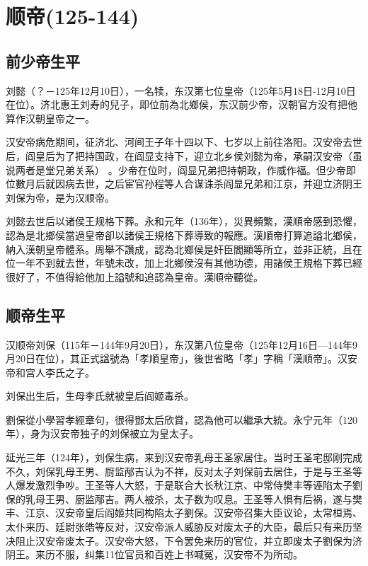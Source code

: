 
\section{顺帝\tiny(125-144)}

\subsection{前少帝生平}

刘懿（？－125年12月10日），一名犊，东汉第七位皇帝（125年5月18日-12月10日在位）。济北惠王刘寿的兒子，即位前為北鄉侯，东汉前少帝，汉朝官方没有把他算作汉朝皇帝之一。

汉安帝病危期间，征济北、河间王子年十四以下、七岁以上前往洛阳。汉安帝去世后，阎皇后为了把持国政，在阎显支持下，迎立北乡侯刘懿为帝，承嗣汉安帝（虽说两者是堂兄弟关系） 。少帝在位时，阎显兄弟把持朝政，作威作福。但少帝即位數月后就因病去世，之后宦官孙程等人合谋诛杀阎显兄弟和江京，并迎立济阴王刘保为帝，是为汉顺帝。

刘懿去世后以诸侯王规格下葬。永和元年（136年），災異頻繁，漢順帝感到恐懼，認為是北鄉侯當過皇帝卻以諸侯王規格下葬導致的報應。漢順帝打算追謚北鄉侯，納入漢朝皇帝體系。周舉不讚成，認為北鄉侯是奸臣閻顯等所立，並非正統，且在位一年不到就去世，年號未改，加上北鄉侯沒有其他功德，用諸侯王規格下葬已經很好了，不值得給他加上謚號和追認為皇帝。漢順帝聽從。

\subsection{顺帝生平}

汉顺帝刘保（115年－144年9月20日），东汉第八位皇帝（125年12月16日—144年9月20日在位），其正式諡號為「孝順皇帝」，後世省略「孝」字稱「漢順帝」。汉安帝和宫人李氏之子。

刘保出生后，生母李氏就被皇后阎姬毒杀。

劉保從小學習孝經章句，很得鄧太后欣賞，認為他可以繼承大統。永宁元年（120年），身为汉安帝独子的刘保被立为皇太子。

延光三年（124年），刘保生病，来到汉安帝乳母王圣家居住。当时王圣宅邸刚完成不久，刘保乳母王男、厨监邴吉认为不祥，反对太子刘保前去居住，于是与王圣等人爆发激烈争吵。王圣等人大怒，于是联合大长秋江京、中常侍樊丰等诬陷太子劉保的乳母王男、厨监邴吉。两人被杀，太子数为叹息。王圣等人惧有后祸，遂与樊丰、江京、汉安帝皇后阎姬共同构陷太子劉保。汉安帝召集大臣议论，太常桓焉、太仆来历、廷尉张皓等反对，汉安帝派人威胁反对废太子的大臣，最后只有来历坚决阻止汉安帝废太子。汉安帝大怒，下令罢免来历的官位，并立即废太子劉保为济阴王。来历不服，纠集11位官员和百姓上书喊冤，汉安帝不为所动。

